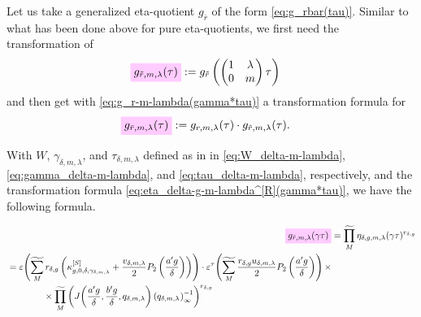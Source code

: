 \documentclass{article}
\begin{document}
Let us take a generalized eta-quotient $g_{\bar{r}}$ of the form
\eqref{eq:g_rbar(tau)}.
Similar to what has been done above for pure eta-quotients, we first
need the transformation of
\begin{align}
  \defineNotation[g-rtilde-m-lambda-tau]{g_{\tilde{r},m,\lambda}(\tau)}
  &:=
  g_{\tilde{r}}
    \left(
    \begin{pmatrix}1&\lambda\\0&m\end{pmatrix}\tau
    \right)
  \label{eq:g_rtilde-m-lambda(tau)}
\end{align}
and then get with \eqref{eq:g_r-m-lambda(gamma*tau)} a transformation
formula for
\begin{align}
  \defineNotation[g-rbar-m-lambda-tau]{g_{\bar{r},m,\lambda}(\tau)}
  &:=
    g_{r,m,\lambda}(\tau)
    \cdot
    g_{\tilde{r},m,\lambda}(\tau).
  \label{eq:g_rbar-m-lambda(tau)}
\end{align}



With $W$, $\gamma_{\delta,m,\lambda}$, and $\tau_{\delta,m,\lambda}$
defined as in in \eqref{eq:W_delta-m-lambda},
\eqref{eq:gamma_delta-m-lambda}, and \eqref{eq:tau_delta-m-lambda},
respectively, and the transformation formula
\eqref{eq:eta_delta-g-m-lambda^[R](gamma*tau)}, we have the following
formula.

\begin{align}
  \defineNotation[g-rtilde-gamma-m-lambda-tau]{g_{\tilde{r},m,\lambda}(\gamma\tau)}
  &=
    \genprod[M]
    \eta_{\delta,g,m,\lambda}(\gamma\tau)^{r_{\delta,g}}
  \notag\\
  \begin{split}
  &=
    \unityPower{
      \gensum[M]
      r_{\delta,g}
      \left(
      \kappa_{g,0,\delta,\gamma_{\delta,m,\lambda}}^{[S]}
      +
      \frac{v_{\delta,m,\lambda}}{2} P_2\left(\frac{a' g}{\delta}\right)
      \right)}
  \cdot
  \unityPowerTau{
    \gensum[M]
    \frac{r_{\delta,g} u_{\delta,m,\lambda}}{2} P_2\left(\frac{a' g}{\delta}\right)}
  \times
  \\
  &\qquad\qquad
  \times
  \genprod[M]
  \left(
    \jacobiAlpha{\frac{a' g}{\delta}}{\frac{b' g}{\delta}}{q_{\delta,m,\lambda}}
    \eulerFunction[q_{\delta,m,\lambda}]{}^{-1}
  \right)^{r_{\delta,g}}
  \end{split}
  \label{eq:g_rtilde-m-lambda(gamma*tau)}
\end{align}
\end{document}
